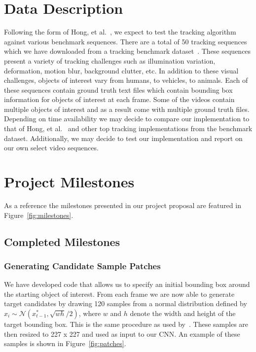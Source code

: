 \documentclass{sig-alternate-05-2015}
\begin{document}
\section{Data Description}
Following the form of Hong, et al.~\cite{hong2015online}, we expect to test the tracking algorithm against various benchmark sequences. 
There are a total of 50 tracking sequences which we have downloaded from a tracking benchmark dataset~\cite{wu2013online}.
These sequences present a variety of tracking challenges such as illumination variation, deformation, motion blur, background clutter, etc. 
In addition to these visual challenges, objects of interest vary from humans, to vehicles, to animals. 
Each of these sequences contain ground truth text files which contain bounding box information for objects of interest at each frame. 
Some of the videos contain multiple objects of interest and as a result come with multiple ground truth files. 
Depending on time availability we may decide to compare our implementation to that of Hong, et al.~\cite{hong2015online} and other top tracking implementations from the benchmark dataset.  Additionally, we may decide to test our implementation and report on our own select video sequences.

\section{Project Milestones}
As a reference the milestones presented in our project proposal are featured in Figure~\ref{fig:milestones}.
\subsection{Completed Milestones}

\subsubsection{Generating Candidate Sample Patches}
We have developed code that allows us to specify an initial bounding box around the starting object of interest. 
From each frame we are now able to generate target candidates by drawing 120 samples from a normal distribution defined by $x_i \sim \mathcal{N}(x_{t-1}^*,\sqrt{wh}/2)$, where $w$ and $h$ denote the width and height of the target bounding box. 
This is the same procedure as used by~\cite{hong2015online}.
These samples are then resized to 227 x 227 and used as input to our CNN.
An example of these samples is shown in Figure~\ref{fig:patches}.
\end{document}
